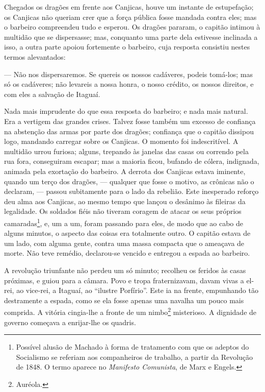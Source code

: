 Chegados os dragões em frente aos Canjicas, houve um instante de
estupefação; os Canjicas não queriam crer que a força pública fosse
mandada contra eles; mas o barbeiro compreendeu tudo e esperou. Os
dragões pararam, o capitão intimou à multidão que se dispersasse; mas,
conquanto uma parte dela estivesse inclinada a isso, a outra parte
apoiou fortemente o barbeiro, cuja resposta consistiu nestes termos
alevantados:

--- Não nos dispersaremos. Se quereis os nossos cadáveres, podeis
tomá-los; mas só os cadáveres; não levareis a nossa honra, o nosso
crédito, os nossos direitos, e com eles a salvação de Itaguaí.

Nada mais imprudente do que essa resposta do barbeiro; e nada mais
natural. Era a vertigem das grandes crises. Talvez fosse também um
excesso de confiança na abstenção das armas por parte dos dragões;
confiança que o capitão dissipou logo, mandando carregar sobre os
Canjicas. O momento foi indescritível. A multidão urrou furiosa; alguns,
trepando às janelas das casas ou correndo pela rua fora, conseguiram
escapar; mas a maioria ficou, bufando de cólera, indignada, animada pela
exortação do barbeiro. A derrota dos Canjicas estava iminente, quando um
terço dos dragões, --- qualquer que fosse o motivo, as crônicas não o
declaram, --- passou subitamente para o lado da rebelião. Este
inesperado reforço deu alma aos Canjicas, ao mesmo tempo que lançou o
desânimo às fileiras da legalidade. Os soldados fiéis não tiveram
coragem de atacar os seus próprios camaradas\footnote{Possível alusão de
  Machado à forma de tratamento com que os adeptos do Socialismo se
  referiam aos companheiros de trabalho, a partir da Revolução de 1848.
  O termo aparece no \emph{Manifesto Comunista}, de Marx e Engels.}, e,
um a um, foram passando para eles, de modo que ao cabo de alguns
minutos, o aspecto das coisas era totalmente outro. O capitão estava de
um lado, com alguma gente, contra uma massa compacta que o ameaçava de
morte. Não teve remédio, declarou-se vencido e entregou a espada ao
barbeiro.

A revolução triunfante não perdeu um só minuto; recolheu os feridos às
casas próximas, e guiou para a câmara. Povo e tropa fraternizavam, davam
vivas a el-rei, ao vice-rei, a Itaguaí, ao ``ilustre Porfírio''. Este ia
na frente, empunhando tão destramente a espada, como se ela fosse apenas
uma navalha um pouco mais comprida. A vitória cingia-lhe a fronte de um
nimbo\footnote{Auréola.} misterioso. A dignidade de governo começava a
enrijar-lhe os quadris.

